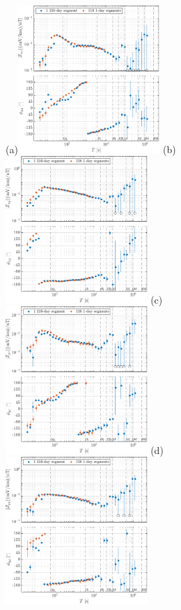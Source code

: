 \documentclass[draft,linenumbers]{agujournal2018}
\begin{document}
\begin{figure}[h!]
  \vspace{-2em}
  \subfigure(a){\includegraphics[width=0.48\textwidth]{figures/zplot-magnitude_phase-Middelpos-tf1-Z_xx.pdf}} 
  \subfigure(b){\includegraphics[width=0.48\textwidth]{figures/zplot-magnitude_phase-Middelpos-tf1-Z_xy.pdf}} 
  \subfigure(c){\includegraphics[width=0.48\textwidth]{figures/zplot-magnitude_phase-Middelpos-tf1-Z_yx.pdf}} 
  \subfigure(d){\includegraphics[width=0.48\textwidth]{figures/zplot-magnitude_phase-Middelpos-tf1-Z_yy.pdf}} 


\end{figure}
\end{document}
